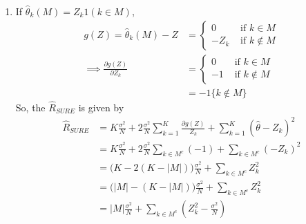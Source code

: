 \documentclass{article}[12pt]
\begin{document}
\begin{enumerate}
    \item If $\hat{\theta}_k(M) = Z_k 1 (k \in M)$,
    \begin{align*}
        g(Z) = \hat{\theta}_k(M) - Z &=
        \begin{cases}
            0 &\mbox{ if $k \in M$} \\
            -Z_k &\mbox{ if $k \notin M$}
        \end{cases}\\
        \implies \frac{\partial g(Z)}{\partial Z_k} &=
        \begin{cases}
            0 &\mbox{ if $k \in M$} \\
            -1 &\mbox{ if $k \notin M$}
        \end{cases} \\
        &= -1\{ k \notin M\}
    \end{align*}
    So, the $\hat{R}_{SURE}$ is given by
    \begin{align*}
        \hat{R}_{SURE} &= K \frac{\sigma^2}{N} + 2 \frac{\sigma^2}{N} \sum_{k=1}^K \frac{\partial g(Z)}{Z_k} + \sum_{k=1}^K (\hat{\theta}-Z_k)^2 \\
        &= K \frac{\sigma^2}{N} + 2 \frac{\sigma^2}{N} \sum_{k \in M^c} (-1) + \sum_{k \in M^c} (-Z_k)^2 \\
        &= \bigg(K - 2(K - |M|)\bigg) \frac{\sigma^2}{N} + \sum_{k \in M^c} Z_k^2 \\
        &= \bigg(|M| - (K - |M|)\bigg) \frac{\sigma^2}{N} + \sum_{k \in M^c} Z_k^2 \\
        &= |M| \frac{\sigma^2}{N} + \sum_{k \in M^c} (Z_k^2 - \frac{\sigma^2}{N})
    \end{align*}

\end{enumerate}
\end{document}
